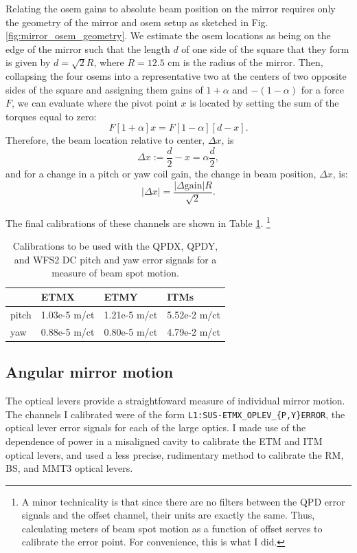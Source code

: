 Relating the osem gains to absolute beam position on the mirror
requires only the geometry of the mirror and osem setup as sketched in
Fig. \ref{fig:mirror_osem_geometry}. We estimate the osem locations as
being on the edge of the mirror such that the length $d$ of one side
of the square that they form is given by $d =\sqrt{2} R$, where $R =
12.5$ cm is the radius of the mirror. Then, collapsing the four osems
into a representative two at the centers of two opposite sides of the
square and assigning them gains of $1 + \alpha$ and $-(1-\alpha)$ for
a force $F$, we can evaluate where the pivot point $x$ is located by
setting the sum of the torques equal to zero:
\begin{equation}
F [1+\alpha] x = F [1-\alpha][d-x].
\end{equation}
Therefore, the beam location relative to center, $\Delta x$, is
\begin{equation}
\Delta x := \frac{d}{2} - x = \alpha \frac{d}{2},
\end{equation}
and for a change in a pitch or yaw coil gain, the change in beam
position, $\Delta x$, is:
\begin{equation}
|\Delta{x}| = \frac{|\Delta{\mbox{gain}}| R}{\sqrt{2}} .
\end{equation}

The final calibrations of these channels are shown in Table
\ref{table:bsmcal}. \footnote{A minor technicality is that since there
  are no filters between the QPD error signals and the offset channel,
  their units are exactly the same. Thus, calculating meters of beam
  spot motion as a function of offset serves to calibrate the error
  point. For convenience, this is what I did.}

\begin{table}
\centering
\caption[Beam spot motion calibrations]{Calibrations to be used with
 the QPDX, QPDY, and WFS2 DC pitch and yaw error signals for a
 measure of beam spot motion.} 
\begin{tabular}{l l l l}
\hline
         & ETMX & ETMY & ITMs \\
\hline
pitch & 1.03e-5 m/ct & 1.21e-5 m/ct & 5.52e-2 m/ct \\
yaw & 0.88e-5 m/ct & 0.80e-5 m/ct & 4.79e-2 m/ct \\
\hline
\end{tabular}
\label{table:bsmcal}
\end{table}



\subsection{Angular mirror motion}
The optical levers provide a straightfoward measure of individual
mirror motion. The channels I calibrated were of the form
\texttt{L1:SUS-ETMX\_OPLEV\_\{P,Y\}ERROR}, the optical lever error
signals for each of the large optics. I made use of the dependence of
power in a misaligned cavity to calibrate the ETM and ITM optical
levers, and used a less precise, rudimentary method to calibrate the
RM, BS, and MMT3 optical levers.


